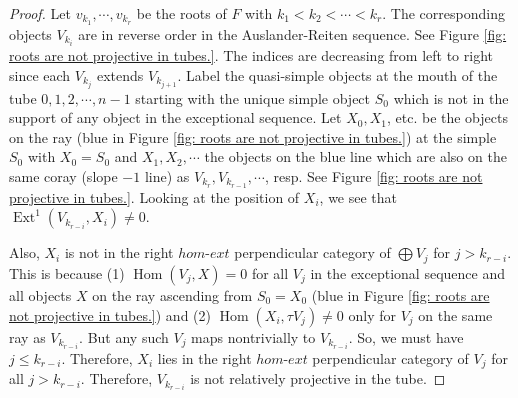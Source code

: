 \documentclass[11pt]{amsart}
\theoremstyle{definition}
\theoremstyle{remark}
\numberwithin{equation}{section}
\DeclareMathOperator{\Hom}{Hom}%
\DeclareMathOperator{\Ext}{Ext}%
\begin{document}
\begin{proof}
Let $v_{k_1}, \cdots, v_{k_r}$ be the roots of $F$ with $k_1<k_2<\cdots<k_r$. The corresponding objects $V_{k_i}$ are in reverse order in the Auslander-Reiten sequence. See Figure \ref{fig: roots are not projective in tubes.}. The indices are decreasing from left to right since each $V_{k_j}$ extends $V_{k_{j+1}}$. Label the quasi-simple objects at the mouth of the tube $0,1,2,\cdots,n-1$ starting with the unique simple object $S_0$ which is not in the support of any object in the exceptional sequence. Let $X_0,X_1$, etc. be the objects on the ray (blue in Figure \ref{fig: roots are not projective in tubes.}) at the simple $S_0$ with $X_0=S_0$ and $X_1,X_2,\cdots$ the objects on the blue line which are also on the same coray (slope $-1$ line) as $V_{k_{r}},V_{k_{r-1}},\cdots$, resp. See Figure \ref{fig: roots are not projective in tubes.}. Looking at the position of $X_i$, we see that $\Ext^1(V_{k_{r-i}},X_i)\neq 0$. 

Also, $X_i$ is not in the right $hom$-$ext$ perpendicular category of $\bigoplus V_j$ for $j>k_{r-i}$. This is because (1) $\Hom(V_j,X)=0$ for all $V_j$ in the exceptional sequence and all objects $X$ on the ray ascending from $S_0=X_0$ (blue in Figure \ref{fig: roots are not projective in tubes.}) and (2) $\Hom(X_i,\tau V_j)\neq0$ only for $V_j$ on the same ray as $V_{k_{r-i}}$. But any such $V_j$ maps nontrivially to $V_{k_{r-i}}$. So, we must have $j\le{k_{r-i}}$. Therefore, $X_i$ lies in the right $hom$-$ext$ perpendicular category of $V_j$ for all $j>{k_{r-i}}$. Therefore, $V_{k_{r-i}}$ is not relatively projective in the tube.
\end{proof}
%
\end{document}

